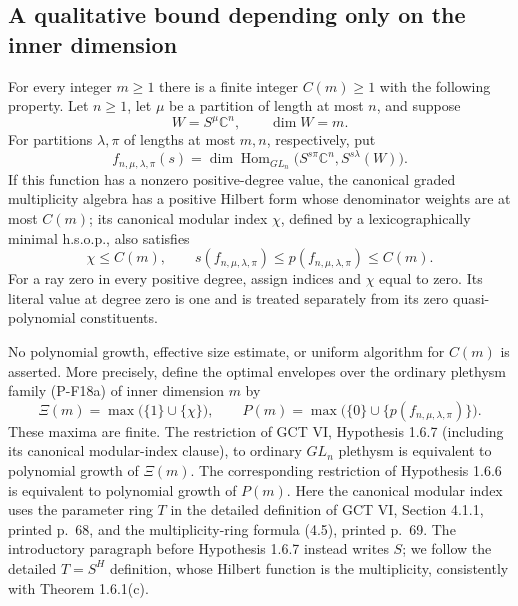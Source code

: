 \subsection{A qualitative bound depending only on the inner dimension}

\begin{proposition}
\label{prop:innerdimensionbound}
For every integer $m\ge1$ there is a finite integer $C(m)\ge1$ with
the following property. Let $n\ge1$, let $\mu$ be a partition of
length at most $n$, and suppose
\[
 W=S^\mu\mathbb C^n,\qquad \dim W=m.
\]
For partitions $\lambda,\pi$ of lengths at most $m,n$, respectively,
put
\[
 f_{n,\mu,\lambda,\pi}(s)
 =\dim\operatorname{Hom}_{GL_n}
   \bigl(S^{s\pi}\mathbb C^n,S^{s\lambda}(W)\bigr).
 \tag{P-F18a}
\]
If this function has a nonzero positive-degree value, the canonical
graded multiplicity algebra has a positive Hilbert form whose
denominator weights are at most $C(m)$; its canonical modular index
$\chi$, defined by a lexicographically minimal h.s.o.p., also satisfies
\[
 \chi\le C(m),\qquad
 s(f_{n,\mu,\lambda,\pi})\le
 p(f_{n,\mu,\lambda,\pi})\le C(m).
 \tag{P-F18b}
\]
For a ray zero in every positive degree, assign indices and $\chi$
equal to zero. Its literal value at degree zero is one and is treated
separately from its zero quasi-polynomial constituents.

No polynomial growth, effective size estimate, or uniform algorithm
for $C(m)$ is asserted. More precisely, define the optimal envelopes
over the ordinary plethysm family (P-F18a) of inner dimension $m$ by
\[
 \Xi(m)=\max\bigl(\{1\}\cup\{\chi\}\bigr),\qquad
 P(m)=\max\bigl(\{0\}\cup\{p(f_{n,\mu,\lambda,\pi})\}\bigr).
 \tag{P-F18c}
\]
These maxima are finite. The restriction of GCT VI,
Hypothesis 1.6.7 (including its canonical modular-index clause), to
ordinary $GL_n$ plethysm is equivalent to polynomial growth of
$\Xi(m)$. The corresponding restriction of Hypothesis 1.6.6 is
equivalent to polynomial growth of $P(m)$.
Here the canonical modular index uses the parameter ring $T$
in the detailed definition of GCT VI, Section 4.1.1, printed p.~68,
and the multiplicity-ring formula (4.5), printed p.~69.
The introductory paragraph before Hypothesis 1.6.7 instead writes
$S$; we follow the detailed $T=S^H$ definition, whose Hilbert
function is the multiplicity, consistently with Theorem 1.6.1(c).
\end{proposition}

